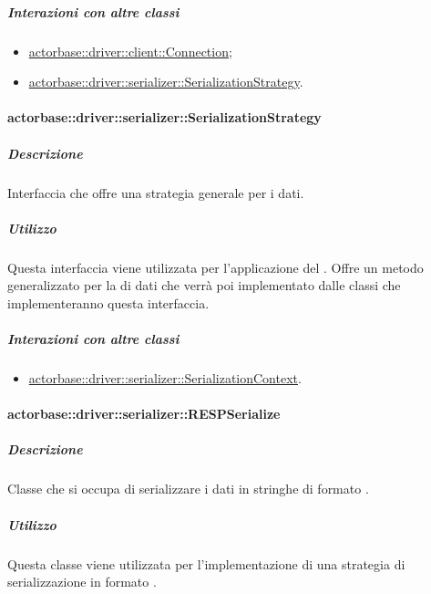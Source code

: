 \documentclass{scalatekids-article}
\begin{document}
\subparagraph{Interazioni con altre classi}

\begin{itemize}

\item \hyperref[sec:actorbase::driver::client::Connection]{actorbase::driver::client::Connection};
\item \hyperref[sec:actorbase::driver::serializer::SerializationStrategy]{actorbase::driver::serializer::SerializationStrategy}.

\end{itemize}

\paragraph{actorbase::driver::serializer::SerializationStrategy}
\label{sec:actorbase::driver::serializer::SerializationStrategy}

\subparagraph{Descrizione}

Interfaccia che offre una strategia generale per  i dati.

\subparagraph{Utilizzo}

Questa interfaccia viene utilizzata per l'applicazione del 
. Offre un metodo generalizzato per la
 di dati che verrà poi implementato dalle classi che
implementeranno questa interfaccia.

\subparagraph{Interazioni con altre classi}

\begin{itemize}

\item \hyperref[sec:actorbase::driver::serializer::SerializationContext]{actorbase::driver::serializer::SerializationContext}.

\end{itemize}

\paragraph{actorbase::driver::serializer::RESPSerialize}

\subparagraph{Descrizione}

Classe che si occupa di serializzare i dati in stringhe di formato .

\subparagraph{Utilizzo}

Questa classe viene utilizzata per l'implementazione di una strategia di
serializzazione in formato .
\end{document}
